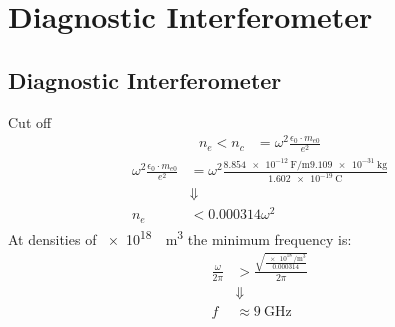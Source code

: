 \documentclass[hyperref={colorlinks=true,urlcolor=blue,linkcolor=.},aspectratio=1610,mathserif]{beamer}
\begin{document}
\section{Diagnostic Interferometer}
\subsection{Diagnostic Interferometer}
\begin{frame}{Cut off}
\begin{align}
    n_e < n_c &= \omega^2\frac{\epsilon_0\cdot m_{e0}}{e^2}
\end{align}
    \begin{align}
  \omega^2\frac{\epsilon_0\cdot m_{e0}}{e^2} &= \omega^2\frac{\SI{8.854e-12}{\farad\per\meter}\SI{9.109e-31}{\kilo\gram}}{\SI{1.602e-19}{\coulomb}}\\
  &\Downarrow\nonumber\\
  n_e &< 0.000314\omega^2
\end{align}
At densities of \SI{e18}{\per\meter\cubed} the minimum frequency is:
\begin{align}
  \frac{\omega}{2\pi} &> \frac{\sqrt{\frac{\SI{e18}{\per\meter\cubed}}{0.000314}}}{2\pi}\\
  &\Downarrow\nonumber\\
  f &\approx \SI{9}{\giga\hertz}
  \end{align}
\end{frame}
\end{document}

